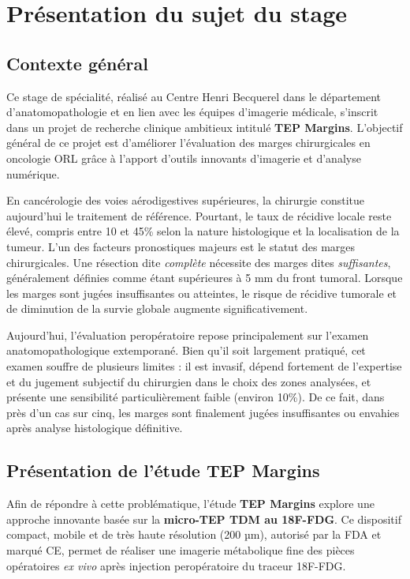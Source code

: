 \documentclass[12pt,a4paper]{report}
\begin{document}
\chapter{Présentation du sujet du stage}

\section{Contexte général}

Ce stage de spécialité, réalisé au Centre Henri Becquerel dans le département d'anatomopathologie et en lien avec les équipes d'imagerie médicale, s'inscrit dans un projet de recherche clinique ambitieux intitulé \textbf{TEP Margins}. L'objectif général de ce projet est d'améliorer l'évaluation des marges chirurgicales en oncologie ORL grâce à l'apport d'outils innovants d'imagerie et d'analyse numérique.

En cancérologie des voies aérodigestives supérieures, la chirurgie constitue aujourd'hui le traitement de référence. Pourtant, le taux de récidive locale reste élevé, compris entre 10 et 45\% selon la nature histologique et la localisation de la tumeur. L'un des facteurs pronostiques majeurs est le statut des marges chirurgicales. Une résection dite \textit{complète} nécessite des marges dites \textit{suffisantes}, généralement définies comme étant supérieures à 5 mm du front tumoral. Lorsque les marges sont jugées insuffisantes ou atteintes, le risque de récidive tumorale et de diminution de la survie globale augmente significativement.

Aujourd'hui, l'évaluation peropératoire repose principalement sur l'examen anatomopathologique extemporané. Bien qu'il soit largement pratiqué, cet examen souffre de plusieurs limites : il est invasif, dépend fortement de l'expertise et du jugement subjectif du chirurgien dans le choix des zones analysées, et présente une sensibilité particulièrement faible (environ 10\%). De ce fait, dans près d'un cas sur cinq, les marges sont finalement jugées insuffisantes ou envahies après analyse histologique définitive.

\section{Présentation de l'étude TEP Margins}

Afin de répondre à cette problématique, l'étude \textbf{TEP Margins} explore une approche innovante basée sur la \textbf{micro-TEP TDM au 18F-FDG}. Ce dispositif compact, mobile et de très haute résolution (200 µm), autorisé par la FDA et marqué CE, permet de réaliser une imagerie métabolique fine des pièces opératoires \textit{ex vivo} après injection peropératoire du traceur 18F-FDG.
\end{document}

